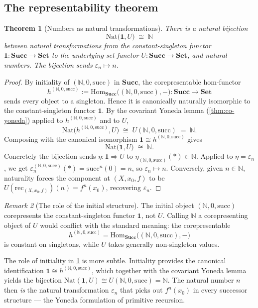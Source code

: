 \documentclass[12pt]{article}
\newtheorem{theorem}{Theorem}[section]
\theoremstyle{definition}
\theoremstyle{remark}
\newtheorem{remark}[theorem]{Remark}
\begin{document}
\subsection{The representability theorem}

\begin{theorem}[Numbers as natural transformations]
\label{thm:numbers-as-representable}
There is a natural bijection
\[
\mathrm{Nat}\!\big(\mathbf{1}, U\big) \;\cong\; \mathbb{N}
\]
between natural transformations from the constant-singleton functor $\mathbf{1}\colon \mathbf{Succ} \to \mathbf{Set}$ to the underlying-set functor $U\colon \mathbf{Succ} \to \mathbf{Set}$, and natural numbers. The bijection sends $\varepsilon_n \mapsto n$.
\end{theorem}

\begin{proof}
By initiality of $(\mathbb{N}, 0, \mathrm{succ})$ in $\mathbf{Succ}$, the corepresentable hom-functor
\[
h^{(\mathbb{N}, 0, \mathrm{succ})} := \mathrm{Hom}_{\mathbf{Succ}}\!\big((\mathbb{N}, 0, \mathrm{succ}), -\big)\colon \mathbf{Succ} \longrightarrow \mathbf{Set}
\]
sends every object to a singleton. Hence it is canonically naturally isomorphic to the constant-singleton functor $\mathbf{1}$. By the covariant Yoneda lemma (\cref{thm:co-yoneda}) applied to $h^{(\mathbb{N}, 0, \mathrm{succ})}$ and to $U$,
\[
\mathrm{Nat}\!\big(h^{(\mathbb{N}, 0, \mathrm{succ})}, U\big) \;\cong\; U(\mathbb{N}, 0, \mathrm{succ}) \;=\; \mathbb{N}.
\]
Composing with the canonical isomorphism $\mathbf{1} \cong h^{(\mathbb{N}, 0, \mathrm{succ})}$ gives
\[
\mathrm{Nat}\!\big(\mathbf{1}, U\big) \;\cong\; \mathbb{N}.
\]
Concretely the bijection sends $\eta\colon \mathbf{1} \Rightarrow U$ to $\eta_{(\mathbb{N}, 0, \mathrm{succ})}(*) \in \mathbb{N}$. Applied to $\eta = \varepsilon_n$, we get $\varepsilon_n^{(\mathbb{N}, 0, \mathrm{succ})}(*) = \mathrm{succ}^n(0) = n$, so $\varepsilon_n \mapsto n$. Conversely, given $n \in \mathbb{N}$, naturality forces the component at $(X, x_0, f)$ to be $U(\mathrm{rec}_{(X, x_0, f)})(n) = f^n(x_0)$, recovering $\varepsilon_n$.
\end{proof}

\begin{remark}[The role of the initial structure]
The initial object $(\mathbb{N}, 0, \mathrm{succ})$ corepresents the constant-singleton functor $\mathbf{1}$, not $U$. Calling $\mathbb{N}$ a corepresenting object of $U$ would conflict with the standard meaning: the corepresentable
\[
h^{(\mathbb{N}, 0, \mathrm{succ})} = \mathrm{Hom}_{\mathbf{Succ}}\!\big((\mathbb{N}, 0, \mathrm{succ}), -\big)
\]
is constant on singletons, while $U$ takes generally non-singleton values.

The role of initiality in \cref{thm:numbers-as-representable} is more subtle. Initiality provides the canonical identification $\mathbf{1} \cong h^{(\mathbb{N}, 0, \mathrm{succ})}$, which together with the covariant Yoneda lemma yields the bijection $\mathrm{Nat}(\mathbf{1}, U) \cong U(\mathbb{N}, 0, \mathrm{succ}) = \mathbb{N}$. The natural number $n$ then \emph{is} the natural transformation $\varepsilon_n$ that picks out $f^n(x_0)$ in every successor structure --- the Yoneda formulation of primitive recursion.
\end{remark}
\end{document}
